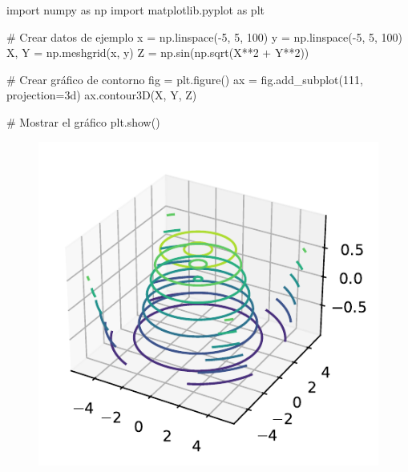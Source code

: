 \documentclass[
  a4paper,
]{article}
\newenvironment{Shaded}{}{}
\newcommand{\CommentTok}[1]{\textcolor[rgb]{0.42,0.45,0.49}{#1}}
\newcommand{\DecValTok}[1]{\textcolor[rgb]{0.00,0.36,0.77}{#1}}
\newcommand{\ImportTok}[1]{\textcolor[rgb]{0.01,0.18,0.38}{#1}}
\newcommand{\NormalTok}[1]{\textcolor[rgb]{0.14,0.16,0.18}{#1}}
\newcommand{\OperatorTok}[1]{\textcolor[rgb]{0.14,0.16,0.18}{#1}}
\newcommand{\StringTok}[1]{\textcolor[rgb]{0.01,0.18,0.38}{#1}}
\begin{document}
\begin{Shaded}
\begin{Highlighting}[]
\ImportTok{import}\NormalTok{ numpy }\ImportTok{as}\NormalTok{ np}
\ImportTok{import}\NormalTok{ matplotlib.pyplot }\ImportTok{as}\NormalTok{ plt}

\CommentTok{\# Crear datos de ejemplo}
\NormalTok{x }\OperatorTok{=}\NormalTok{ np.linspace(}\OperatorTok{{-}}\DecValTok{5}\NormalTok{, }\DecValTok{5}\NormalTok{, }\DecValTok{100}\NormalTok{)}
\NormalTok{y }\OperatorTok{=}\NormalTok{ np.linspace(}\OperatorTok{{-}}\DecValTok{5}\NormalTok{, }\DecValTok{5}\NormalTok{, }\DecValTok{100}\NormalTok{)}
\NormalTok{X, Y }\OperatorTok{=}\NormalTok{ np.meshgrid(x, y)}
\NormalTok{Z }\OperatorTok{=}\NormalTok{ np.sin(np.sqrt(X}\OperatorTok{**}\DecValTok{2} \OperatorTok{+}\NormalTok{ Y}\OperatorTok{**}\DecValTok{2}\NormalTok{))}

\CommentTok{\# Crear gráfico de contorno}
\NormalTok{fig }\OperatorTok{=}\NormalTok{ plt.figure()}
\NormalTok{ax }\OperatorTok{=}\NormalTok{ fig.add\_subplot(}\DecValTok{111}\NormalTok{, projection}\OperatorTok{=}\StringTok{\textquotesingle{}3d\textquotesingle{}}\NormalTok{)}
\NormalTok{ax.contour3D(X, Y, Z)}

\CommentTok{\# Mostrar el gráfico}
\NormalTok{plt.show()}
\end{Highlighting}
\end{Shaded}

\begin{figure}[H]

{\centering \includegraphics{index_files/figure-pdf/cell-4-output-1.pdf}

}

\end{figure}
\end{document}
